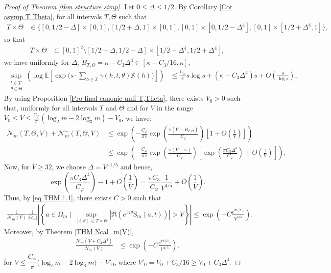 \documentclass[12pt]{amsart}
\theoremstyle{definition}
\numberwithin{equation}{section}
\numberwithin{equation}{section}
\def\E{\mathbb{E}}
\def\Ncal{\mathcal{N}}
\def\Z{\mathbb{Z}}
\def\B{\mathrm{S}}
\def\Mp{C_\varphi}
\def\X{\mathbb{X}}
\def\E{\mathbb{E}}
\begin{document}
\begin{proof}[Proof of Theorem \ref{thm structure simp}] 
 Let $ 0\leq  \Delta \leq 1/2$.
By Corollary \ref{Cor asymp T Theta}, for all intervals $T,\Theta$ such that 
\begin{align*}
T\times\Theta 
& \in \{[0,1/2-\Delta]\times [0,1], [1/2+\Delta,1]\times [0,1], [0,1]\times[0,1/2-\Delta^4], [0,1]\times [1/2+\Delta^4,1]\},
\end{align*}
so that
\begin{align*}
T\times\Theta &\subset [0,1]^2\setminus[1/2-\Delta,1/2+\Delta]\times[1/2-\Delta^4,1/2+\Delta^4],
\end{align*} 
we have uniformly for $\Delta$, $B_{T,\Theta} = \kappa - C_3 \Delta^4\in [\kappa- C_3/16,\kappa]$,
\begin{align*}
\sup_{\substack{t\in T\\ \theta\in\Theta}}
\left(
\log \E \left[\exp \Big(s \cdot \sum_{h \in \Z}
   \gamma(h,t,\theta)\X(h)\Big) \right] \right)
     &\leq  \frac{\Mp}{\pi} s \log s+(\kappa - C_3 \Delta^4) s+ O\left(\frac{s}{\log s}\right),
\end{align*}
By using Proposition
\ref{Pro final canonic unif T,Theta}, there exists $V_0>0$ such that, uniformly for all intervals $T$ and $\Theta$ and for $V$ in the range $V_0\leq V \leq \frac{\Mp}{\pi}\left(\log_2 m-2\log_3 m\right)-V_0$, we have:
\begin{align*}
    \Ncal_m(T,\Theta,V)+ \Ncal_m^-(T,\Theta,V)
    &\leq 
\exp\left(- \frac{\Mp}{\pi e} \exp\left(\frac{\pi (V-B_{T,\Theta})}{\Mp}\right)\left[1+O\left(\frac{1}{V}\right)\right] 
\right)\\
&\leq \exp\left(- \frac{\Mp}{\pi e} \exp\left(\frac{\pi (V-\kappa)}{\Mp}\right)\left[\exp\left(\frac{\pi C_3 \Delta^4}{\Mp}\right)
+O\left(\frac{1}{V}\right)\right] 
\right).
\end{align*}
Now, for $V\geq 32$, we choose $\Delta = V^{-1/5}$ and hence,
\[\exp\left(\frac{\pi C_3 \Delta^4}{\Mp}\right)-1 +O\left(\frac{1}{V}\right)=\frac{\pi C_3}{\Mp}\frac{1}{V^{4/5}} +O\left(\frac{1}{V}\right)
.\]
Thus, by \eqref{eq THM 1.1}, there exists $C>0$ such that
\begin{align}\label{eq N(T,theta) C_3 D^4}
\frac{1}{\Ncal_m(V)}\frac{1}{|\Omega_m|}\left|\left\{
a\in \Omega_m \;\big|\; 
\sup_{(t,\theta) \in T\times\Theta}
\left|
\Re\left(e^{\pi i\theta}\B_m(a,t)\right) \right|
>V
\right\}\right|
\leq  
\exp\left(- C\frac{e^{\pi V/\Mp}}{V^{4/5}}\right)  .
\end{align}
Moreover, by Theorem \ref{THM Ncal_m(V)}, 
\begin{align}\label{eq N(V+C_3 D^4)}
\frac{\Ncal_m\left(V+C_3 \Delta^4 \right)}{\Ncal_m(V)}
&\leq  
\exp\left(- C\frac{e^{\pi V/\Mp}}{V^{4/5}}\right) .
\end{align}
for $V \leq
\dfrac{\Mp}{\pi}\big(\log_2 m-2\log_3 m\big)-V'_0$, where $V'_0 = V_0+ C_3/16\geq V_0 +C_3 \Delta ^4$. 


\end{proof}
\end{document}
